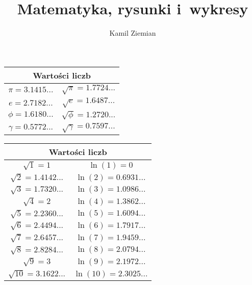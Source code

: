 \documentclass[a4paper,11pt]{article}
\title{Matematyka, rysunki i~wykresy}
\author{Kamil Ziemian}
\begin{document}





\maketitle %



\begin{center}

  \begin{tabular}{|c|c|}
    \hline
    \multicolumn{2}{|c|}{Wartości liczb} \\
    \hline
    $\pi = 3.1415...$ & $\sqrt{ \pi } = 1.7724...$ \\
    $e = 2.7182...$ & $\sqrt{ e } = 1.6487...$ \\
    $\phi = 1.6180...$ & $\sqrt{ \phi } = 1.2720...$ \\
    $\gamma = 0.5772...$ & $\sqrt{ \gamma } = 0.7597...$ \\
    \hline
  \end{tabular}

\end{center}





\begin{center}

  \begin{tabular}{|c|c|}
    \hline
    \multicolumn{2}{|c|}{Wartości liczb} \\
    \hline
    $\sqrt{ 1 } = 1$ & $\ln( 1 ) = 0$ \\
    $\sqrt{ 2 } = 1.4142...$ & $\ln( 2 ) = 0.6931...$ \\
    $\sqrt{ 3 } = 1.7320...$ & $\ln( 3 ) = 1.0986...$ \\
    $\sqrt{ 4 } = 2$ & $\ln( 4 ) = 1.3862...$ \\
    $\sqrt{ 5 } = 2.2360...$ & $\ln( 5 ) = 1.6094...$ \\
    $\sqrt{ 6 } = 2.4494...$ & $\ln( 6 ) = 1.7917...$ \\
    $\sqrt{ 7 } = 2.6457...$ & $\ln( 7 ) = 1.9459...$ \\
    $\sqrt{ 8 } = 2.8284...$ & $\ln( 8 ) = 2.0794...$ \\
    $\sqrt{ 9 } = 3$ & $\ln( 9 ) = 2.1972...$ \\
    $\sqrt{ 10 } = 3.1622...$ & $\ln( 10 ) = 2.3025...$ \\
    \hline
  \end{tabular}

\end{center}
\end{document}
